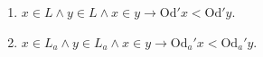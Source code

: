 \begin{enumerate}
\item $x \in L \land y \in L \land x \in y \rightarrow \mathrm{Od}'x < \mathrm{Od}'y.$
\item $x \in L_a \land y \in L_a \land x \in y \rightarrow \mathrm{Od}_a'x < \mathrm{Od}_a'y.$
\end{enumerate}
